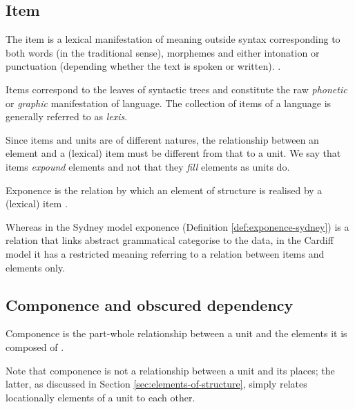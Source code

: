 \subsection{Item}
\begin{definition}[Item]\label{def:item}
	The item is a lexical manifestation of meaning outside syntax corresponding to both words (in the traditional sense), morphemes and either intonation or punctuation (depending whether the text is spoken or written). \citep[226--232]{Fawcett2000}. 
\end{definition}

Items correspond to the leaves of syntactic trees and constitute the raw \textit{phonetic} or \textit{graphic} manifestation of language. The collection of items of a language is generally referred to as \textit{lexis}.

Since items and units are of different natures, the relationship between an element and a (lexical) item must be different from that to a unit. We say that items \textit{expound} elements and not that they \textit{fill} elements as units do. 

\begin{definition}\label{def:exponence}
    Exponence is the relation by which an element of structure is realised by a (lexical) item \citep[254]{Fawcett2000}. 
\end{definition}

Whereas in the Sydney model exponence (Definition \ref{def:exponence-sydney}) is a relation that links abstract grammatical categorise to the data, in the Cardiff model it has a restricted meaning referring to a relation between items and elements only. 

\subsection{Componence and obscured dependency}
\label{sec:componence}

\begin{definition}[Componence]\label{def:componence}
    Componence is the part-whole relationship between a unit and the elements it is composed of \citep[244]{Fawcett2000}. 
\end{definition}

Note that componence is not a relationship between a unit and its places; the latter, as discussed in Section \ref{sec:elements-of-structure}, simply relates locationally elements of a unit to each other.

